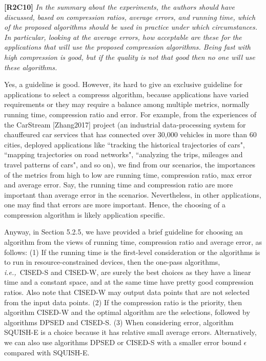 \documentclass{letter}
\newcommand{\ie}{\emph{i.e.,}\xspace}
\begin{document}
\textbf{[R2C10]} \emph{In the summary about the experiments, the authors should have discussed, based on compression ratios, average errors, and running time, which of the proposed algorithms should be used in practice under which circumstances. In particular, looking at the average errors, how acceptable are these for the applications that will use the proposed compression algorithms. Being fast with high compression is good, but if the quality is not that good then no one will use these algorithms.}

Yes, a guideline is good. However, its hard to give an exclusive guideline for applications to select a compresss algorithm, because applications have varied requirements or they may require a balance among multiple metrics, normally running time, compression ratio and  error. For example, from the experiences of the CarStream [Zhang2017] project (an industrial data-processing system for chauffeured car services that has connected over 30,000 vehicles in more than 60 cities, deployed applications like ``tracking the historical trajectories of cars", ``mapping trajectories on road networks", ``analyzing the trips, mileages and travel patterns of cars", and so on), we find from our scenarios,  the importances of the metrics from high to low are running time, compression ratio, max error and average error. Say, the running time and compression ratio are more important than average error in the scenarios.
Nevertheless, in other applications, one may find that errors are more important.
Hence, the choosing of a compression algorithm is likely application specific.

Anyway, in Section 5.2.5, we have provided a brief guideline for choosing an algorithm from the views of running time, compression ratio and average error, as follows:
(1) If the running time is the first-level consideration or the algorithms is to run in resource-constrained devices, then the one-pass algorithms, \ie~CISED-S and CISED-W, are surely the best choices as they have a linear time and a constant space, and at the same time have pretty good compression ratios. Also note that CISED-W may output data points that are not selected from the input data points.
%
(2) If the compression ratio is the priority, then algorithm CISED-W and the optimal algorithm are the selections, followed by algorithms DPSED and CISED-S.
%
(3) When considering error, algorithm SQUISH-E is a choice because it has relative small average errors. Alternatively, we can also use algorithms DPSED or CISED-S with a smaller error bound $\epsilon$ compared with SQUISH-E.
\end{document}
